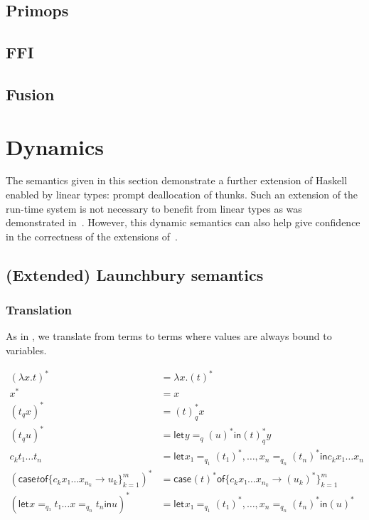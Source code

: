 \documentclass[11pt]{article}
\newcommand{\case}[3][]{\mathsf{case}_{#1} #2 \mathsf{of} \{#3\}^m_{k=1}}
\newcommand{\flet}[1][]{\mathsf{let}_{#1} }
\newcommand{\fin}{ \mathsf{in} }
\begin{document}
\subsection{Primops}
\subsection{FFI}
\subsection{Fusion}


\section{Dynamics}
\label{sec:orgheadline16}

The semantics given in this section demonstrate a further extension of
Haskell enabled by linear types: prompt deallocation of thunks. Such
an extension of the run-time system is not necessary to benefit from
linear types as was demonstrated in~\label{sec:ghc}. However, this
dynamic semantics can also help give confidence in the correctness of
the extensions of~\label{sec:ghc}.

\subsection{(Extended) Launchbury semantics}
\label{sec:orgheadline11}

\subsubsection{Translation}
\label{sec:orgheadline9}
As in \textcite{launchbury_natural_1993}, we translate from terms to
terms where values are always bound to variables. 


\begin{align*}
(λx. t)^* &= λx. (t)^* \\
x^*       &= x \\
  (t_q  x )^* &= (t)^*_q  x \\
  (t_q  u )^* &= \flet y =_{q} (u)^* \fin (t)^*_q  y \\
c_k  t₁ … t_n &= \flet x₁ =_{q_1} (t₁)^*,…, x_n =_{q_n} (t_n)^* \fin c_k x₁ … x_n \\
(\case t {c_k  x₁ … x_{n_k} → u_k})^* &= \case {(t)^*} {c_k  x₁ … x_{n_k} → (u_k)^*} \\
(\flet x =_{q₁} t₁  …  x =_{q_n} t_n \fin u)^* & = \flet x₁ =_{q_1} (t₁)^*,…, x_n =_{q_n} (t_n)^* \fin (u)^*
\end{align*}
\end{document}
